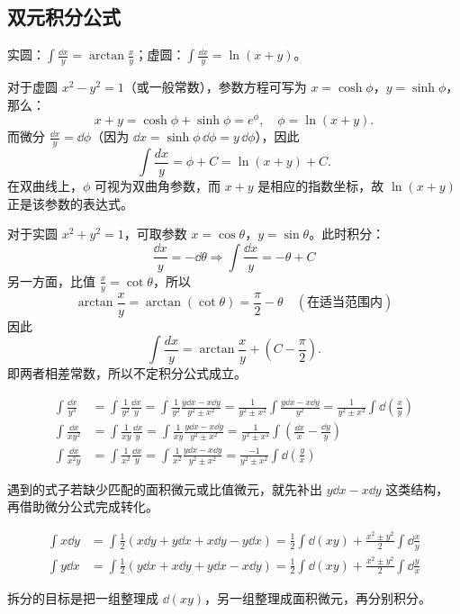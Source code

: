 \subsection{双元积分公式}
\begin{theorem}[基本积分公式]
实圆：$\int\frac{\dd x}{y}=\arctan\frac{x}{y}$；虚圆：$\int \frac{\dd x}{y}=\ln(x+y)$。
\end{theorem}
对于虚圆 \(x^2 - y^2 = 1\)（或一般常数），参数方程可写为 \(x = \cosh \phi\)，\(y = \sinh \phi\)，那么：
\[
x + y = \cosh \phi + \sinh \phi = e^\phi,\quad\phi = \ln(x + y).
\]
而微分 \(\frac{\dd x}{y} = \dd\phi\)（因为 \(\dd x = \sinh \phi \, \dd\phi = y \, \dd\phi\)），因此
\[
\int \frac{dx}{y} = \phi + C = \ln(x + y) + C.
\]
在双曲线上，\(\phi\) 可视为双曲角参数，而 \(x+y\) 是相应的指数坐标，故 \(\ln(x+y)\) 正是该参数的表达式。

对于实圆 \(x^2 + y^2 = 1\)，可取参数 \(x = \cos\theta\)，\(y = \sin\theta\)。此时积分：
\[\frac{\dd x}{y} = -\dd \theta\Rightarrow\int \frac{\dd x}{y} = -\theta + C\]
另一方面，比值 \(\frac{x}{y} = \cot\theta\)，所以
\[\arctan\frac{x}{y} = \arctan(\cot\theta) = \frac{\pi}{2} - \theta \quad (\text{在适当范围内})\]
因此\[\int \frac{dx}{y} = \arctan\frac{x}{y} + \left(C - \frac{\pi}{2}\right).\]
即两者相差常数，所以不定积分公式成立。

\begin{theorem}[三次倒数型]
\vspace{-15pt}
\begin{align*}
\int \frac{\dd x}{y^3} &=\int\frac{1}{y^2}\frac{\dd x}{y}=\int\frac{1}{y^2}\frac{y\dd x-x\dd y}{y^2\pm x^2} =\frac{1}{y^2\pm x^2}\int\frac{y\dd x-x\dd y}{y^2}=\frac{1}{y^2\pm x^2}\int\dd\left(\frac{x}{y}\right)\\
\int \frac{\dd x}{xy^2}&=\int\frac1{xy}\frac{\dd x}{y}=\int\frac1{xy}\frac{y\dd x-x\dd y}{y^2\pm x^2}=\frac{1}{y^2\pm x^2}\int\left(\frac{\dd x}{x}-\frac{\dd y}{y}\right)\\
\int \frac{\dd x}{x^2y}&=\int\frac{1}{x^2}\frac{\dd x}{y}=\int\frac{1}{x^2}\frac{y\dd x-x\dd y}{y^2\pm x^2}=\frac{-1}{y^2\pm x^2}\int\dd\left(\frac{y}{x}\right)
\end{align*}
\end{theorem}
遇到的式子若缺少匹配的面积微元或比值微元，就先补出 \(y\dd x-x\dd y\) 这类结构，再借助微分公式完成转化。

\begin{theorem}[线性微元型]
\vspace{-15pt}
\begin{align*}
\int x\dd y&=\int\frac12\left(x\dd y+y\dd x+x\dd y-y\dd x\right)=\frac12\int\dd(xy)+\frac{x^2\pm y^2}2\int\dd\frac{x}{y}\\
\int y\dd x&=\int\frac12\left(y\dd x+x\dd y+y\dd x-x\dd y\right)=\frac12\int\dd(xy)+\frac{x^2\pm y^2}2\int\dd\frac{y}{x}
\end{align*}
\end{theorem}
拆分的目标是把一组整理成 \(\dd(xy)\)，另一组整理成面积微元，再分别积分。

